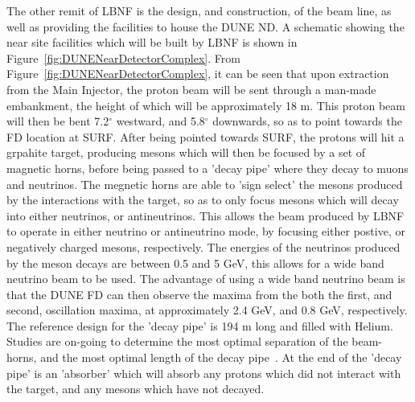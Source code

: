 The other remit of LBNF is the design, and construction, of the beam line, as well as providing the facilities to house the DUNE ND. A schematic showing the near site facilities which will be built by LBNF is shown in Figure~\ref{fig:DUNENearDetectorComplex}. From Figure~\ref{fig:DUNENearDetectorComplex}, it can be seen that upon extraction from the Main Injector, the proton beam will be sent through a man-made embankment, the height of which will be approximately 18 m. This proton beam will then be bent 7.2$^{\circ}$ westward, and 5.8$^{\circ}$ downwards, so as to point towards the FD location at SURF. After being pointed towards SURF, the protons will hit a grpahite target, producing mesons which will then be focused by a set of magnetic horns, before being passed to a 'decay pipe' where they decay to muons and neutrinos. The megnetic horns are able to 'sign select' the mesons produced by the interactions with the target, so as to only focus mesons which will decay into either neutrinos, or antineutrinos. This allows the beam produced by LBNF to operate in either neutrino or antineutrino mode, by focusing either postive, or negatively charged mesons, respectively. The energies of the neutrinos produced by the meson decays are between 0.5 and 5 GeV, this allows for a wide band neutrino beam to be used. The advantage of using a wide band neutrino beam is that the DUNE FD can then observe the maxima from the both the first, and second, oscillation maxima, at approximately 2.4 GeV, and 0.8 GeV, respectively. The reference design for the 'decay pipe' is 194 m long and filled with Helium. Studies are on-going to determine the most optimal separation of the beam-horns, and the most optimal length of the decay pipe~\citep{DUNECDR_V2, DUNECDR_V3}. At the end of the 'decay pipe' is an 'absorber' which will absorb any protons which did not interact with the target, and any mesons which have not decayed. \\

